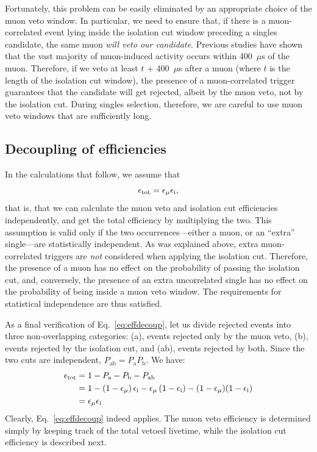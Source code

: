 \documentclass[../thesis.tex]{subfiles}
\begin{document}
Fortunately, this problem can be easily eliminated by an appropriate choice of the muon veto window. In particular, we need to ensure that, if there is a muon-correlated event lying inside the isolation cut window preceding a singles candidate, the same muon \emph{will veto our candidate}. Previous studies have shown that the vast majority of muon-induced activity occurs within 400~$\mu$s of the muon. Therefore, if we veto at least $t$ + 400~$\mu$s after a muon (where $t$ is the length of the isolation cut window), the presence of a muon-correlated trigger guarantees that the candidate will get rejected, albeit by the muon veto, not by the isolation cut. During singles selection, therefore, we are careful to use muon veto windows that are sufficiently long.

\subsection{Decoupling of efficiencies}
\label{sec:effdecoup}

\def\Pa{\ensuremath{P_\mathrm{a}}}
\def\Pb{\ensuremath{P_\mathrm{b}}}
\def\Pab{\ensuremath{P_\mathrm{ab}}}

In the calculations that follow, we assume that
\begin{equation}
  \label{eq:effdecoup}
  \epsilon_\mathrm{tot} = \epsilon_\mathrm{\mu} \epsilon_\mathrm{i},
\end{equation}
that is, that we can calculate the muon veto and isolation cut efficiencies independently, and get the total efficiency by multiplying the two. This assumption is valid only if the two occurrences---either a muon, or an ``extra'' single---are statistically independent. As was explained above, extra muon-correlated triggers are \emph{not} considered when applying the isolation cut. Therefore, the presence of a muon has no effect on the probability of passing the isolation cut, and, conversely, the presence of an extra uncorrelated single has no effect on the probability of being inside a muon veto window. The requirements for statistical independence are thus satisfied.

As a final verification of Eq.~\ref{eq:effdecoup}, let us divide rejected events into three non-overlapping categories: (a), events rejected only by the muon veto, (b), events rejected by the isolation cut, and (ab), events rejected by both. Since the two cuts are independent, $\Pab = \Pa\Pb$. We have:
\begin{align*}
  \etot &= 1 - \Pa - \Pb - \Pab \\
        &= 1 - (1-\emu)\,\eisol - \emu\,(1-\eisol) - (1-\emu)(1-\eisol) \\
        &= \emu \eisol
\end{align*}
Clearly, Eq.~\ref{eq:effdecoup} indeed applies. The muon veto efficiency is determined simply by keeping track of the total vetoed livetime, while the isolation cut efficiency is described next.
\end{document}
